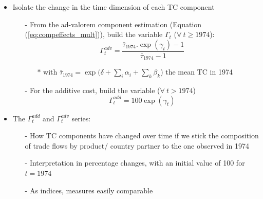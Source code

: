 \documentclass[10 pt,Helvetica, french]{beamer}
\begin{document}
\begin{frame}[label = app_compeffects_details2]
\begin{itemize}
\item Isolate the change in the time dimension of each TC component \vspace{0.1cm}
\begin{itemize}
\item[-] From the ad-valorem component estimation (Equation (\ref{eq:compeffects_mult})), build the variable $\Gamma_t$ ($\forall~t \geq 1974$):
\footnotesize
\begin{equation*}
 \Gamma^{adv}_t= \frac {\bar{\tau}_{1974}.\exp(\gamma_t)-1} {\bar{\tau}_{1974}-1}
\end{equation*}
\normalsize
\begin{itemize}
\item[$\ast$] with $\bar{\tau}_{1974} = \exp(\delta+\sum_i \alpha_i + \sum_k \beta_k$) the mean TC in 1974
\end{itemize}
\item[-] For the additive cost, build the variable ($\forall~t > 1974$)
\footnotesize
$$\Gamma^{add}_t = 100 \exp(\gamma_t)$$
\normalsize
\end{itemize}
\item The $\Gamma^{add}_t$ and $\Gamma^{adv}_t$ series:
\begin{itemize}
\item[-] How TC components have changed over time if we stick the composition of trade flows by product/ country partner to the one observed in 1974  \vspace{0.1cm}
\item[-] Interpretation in percentage changes, with an initial value of 100 for $t=1974$    \vspace{0.1cm}
\item[-] As indices, measures easily comparable
\end{itemize}
\end{itemize}

\end{frame}
\end{document}
